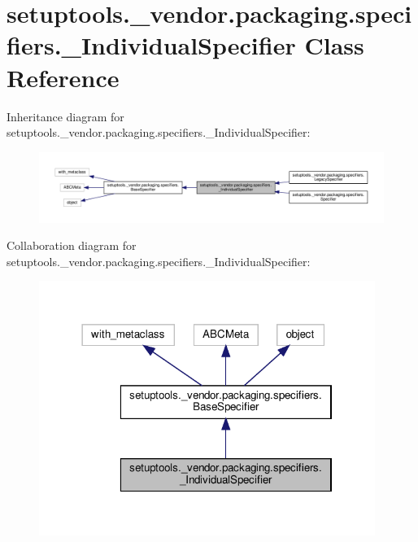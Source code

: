 \hypertarget{classsetuptools_1_1__vendor_1_1packaging_1_1specifiers_1_1__IndividualSpecifier}{}\section{setuptools.\+\_\+vendor.\+packaging.\+specifiers.\+\_\+\+Individual\+Specifier Class Reference}
\label{classsetuptools_1_1__vendor_1_1packaging_1_1specifiers_1_1__IndividualSpecifier}


Inheritance diagram for setuptools.\+\_\+vendor.\+packaging.\+specifiers.\+\_\+\+Individual\+Specifier\+:
\nopagebreak
\begin{figure}[H]
\begin{center}
\leavevmode
\includegraphics[width=350pt]{classsetuptools_1_1__vendor_1_1packaging_1_1specifiers_1_1__IndividualSpecifier__inherit__graph}
\end{center}
\end{figure}


Collaboration diagram for setuptools.\+\_\+vendor.\+packaging.\+specifiers.\+\_\+\+Individual\+Specifier\+:
\nopagebreak
\begin{figure}[H]
\begin{center}
\leavevmode
\includegraphics[width=310pt]{classsetuptools_1_1__vendor_1_1packaging_1_1specifiers_1_1__IndividualSpecifier__coll__graph}
\end{center}
\end{figure}
